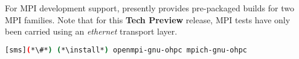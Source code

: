 For MPI development support, \OHPC{} presently provides pre-packaged builds for
two MPI families. Note that for this {\bf Tech Preview} release, MPI tests have only been
carried using an {\em ethernet} transport layer.

\begin{lstlisting}[language=bash]
[sms](*\#*) (*\install*) openmpi-gnu-ohpc mpich-gnu-ohpc
\end{lstlisting}



